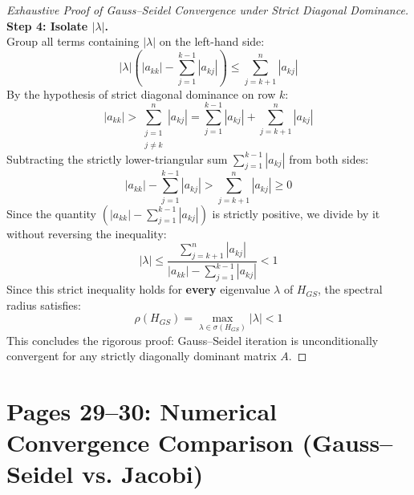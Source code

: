 \begin{proof}[Exhaustive Proof of Gauss--Seidel Convergence under Strict Diagonal Dominance]
\noindent\textbf{Step 4: Isolate $|\lambda|$.} \\
Group all terms containing $|\lambda|$ on the left-hand side:
\begin{equation}
    |\lambda| \left( |a_{kk}| - \sum_{j=1}^{k-1} |a_{kj}| \right) \le \sum_{j=k+1}^n |a_{kj}|
\end{equation}
By the hypothesis of strict diagonal dominance on row $k$:
\begin{equation}
    |a_{kk}| > \sum_{\substack{j=1 \\ j \ne k}}^n |a_{kj}| = \sum_{j=1}^{k-1} |a_{kj}| + \sum_{j=k+1}^n |a_{kj}|
\end{equation}
Subtracting the strictly lower-triangular sum $\sum_{j=1}^{k-1} |a_{kj}|$ from both sides:
\begin{equation}
    |a_{kk}| - \sum_{j=1}^{k-1} |a_{kj}| > \sum_{j=k+1}^n |a_{kj}| \ge 0
\end{equation}
Since the quantity $\left( |a_{kk}| - \sum_{j=1}^{k-1} |a_{kj}| \right)$ is strictly positive, we divide by it without reversing the inequality:
\begin{equation}
    |\lambda| \le \frac{\sum_{j=k+1}^n |a_{kj}|}{|a_{kk}| - \sum_{j=1}^{k-1} |a_{kj}|} < 1
\end{equation}
Since this strict inequality holds for \textbf{every} eigenvalue $\lambda$ of $H_{GS}$, the spectral radius satisfies:
\begin{equation}
    \boxed{\rho(H_{GS}) = \max_{\lambda \in \sigma(H_{GS})} |\lambda| < 1}
\end{equation}
This concludes the rigorous proof: Gauss--Seidel iteration is unconditionally convergent for any strictly diagonally dominant matrix $A$.
\end{proof}


\section{Pages 29--30: Numerical Convergence Comparison (Gauss--Seidel vs. Jacobi)}
\label{sec:gauss_seidel_comparison}

